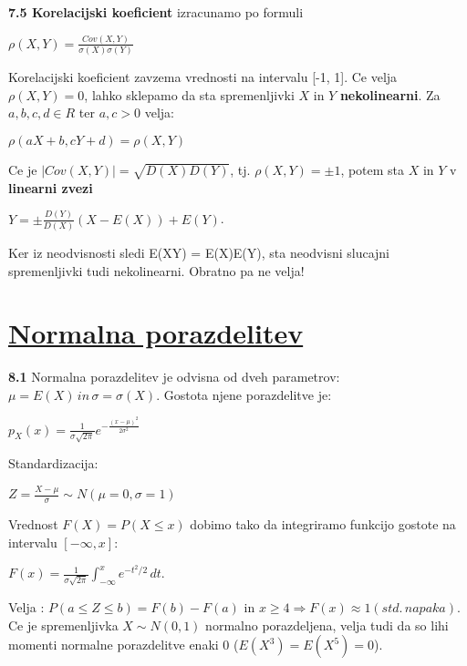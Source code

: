 \documentclass{article}
\begin{document}
\begin{multicols}{3}
\textbf{7.5 Korelacijski koeficient} izracunamo po formuli
\begin{center}
    \begin{math}
        \rho(X,Y) = \frac{Cov(X,Y)}
                      {\sigma(X) \sigma(Y)}
    \end{math}
\end{center}
Korelacijski koeficient zavzema vrednosti na intervalu [-1, 1].
Ce velja $\rho(X, Y) = 0$, lahko sklepamo da sta spremenljivki $X$ in $Y$ \textbf{nekolinearni}.
Za $a, b, c, d \in R$ ter $a, c > 0$ velja:
\begin{center}
    $\rho(aX + b, cY + d) = \rho(X, Y)$
\end{center}
Ce je $|Cov(X, Y)| = \sqrt{D(X)D(Y)}$, tj. $\rho(X, Y) = \pm 1$, potem sta $X$ in $Y$ v \textbf{linearni zvezi}
\begin{center}
    \begin{math}
        Y = \pm \frac{D(Y)}{D(X)}(X - E(X)) + E(Y)
    \end{math}.
\end{center}
Ker iz neodvisnosti sledi E(XY) = E(X)E(Y), sta neodvisni slucajni spremenljivki tudi nekolinearni. Obratno
pa ne velja!

\section{\underline{Normalna porazdelitev}}

\textbf{8.1} Normalna porazdelitev je odvisna od dveh parametrov:
$\mu = E(X)\, in\, \sigma = \sigma(X)$. Gostota njene porazdelitve je:
\begin{center}
    \begin{math}
        p_{X}(x) = \frac{1}{\sigma \sqrt{2 \pi}} e^{- \frac{(x - \mu)^{2}}{2 \sigma^{2}}}
    \end{math}        
\end{center}
Standardizacija: 
\begin{center}
    \begin{math}
        Z = \frac{X - \mu}{\sigma} \sim N(\mu =  0, \sigma = 1)
    \end{math}
\end{center}
Vrednost $F(X) = P(X \leq x)$ dobimo tako da integriramo
funkcijo gostote na intervalu $[-\infty, x]$:
\begin{center}
    \begin{math}
        F(x) = \frac{1}{\sigma \sqrt{2 \pi}} \int_{-\infty}^x e^{-t^2 / 2}\, dt
    \end{math}.
\end{center}
Velja : $P (a \leq Z \leq b) = F(b) - F(a)$ in $x \geq 4 \Rightarrow F(x) \approx 1 (std.\, napaka)$.\\
Ce je spremenljivka $X \sim N(0,1)$ normalno porazdeljena, velja tudi da so lihi momenti normalne porazdelitve enaki 0 ($E(X^3) = E(X^5) = 0$).


\end{multicols}
\end{document}
